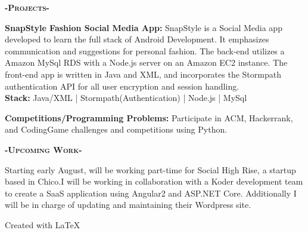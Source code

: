 \documentclass[12pt]{article}
\begin{document}
\begin{center}
\textbf{\textsc{-Projects-}}\\
\end{center}
\begin{footnotesize}

\flushleft
\color{Cerulean}\textbf{SnapStyle Fashion Social Media App:} 
\color{Black}SnapStyle is a Social Media app developed to learn the full stack of Android Development. It emphasizes communication and suggestions for personal fashion. The back-end utilizes a \color{TealBlue}Amazon MySql RDS \color{Black}with a \color{TealBlue}Node.js \color{Black} server on an \color{TealBlue}Amazon EC2 \color{Black}instance. The front-end app is written in \color{TealBlue}Java and XML, \color{Black} and incorporates the \color{TealBlue}Stormpath \color{Black}authentication API for all user encryption and session handling.\\
\smallskip
\setlength\parindent{24pt}\textbf{Stack:} \color{TealBlue} Java/XML | Stormpath(Authentication) | Node.js | MySql
\bigskip

\setlength\parindent{0pt}
\color{Cerulean}\textbf{Competitions/Programming Problems:}
\color{Black}Participate in ACM, Hackerrank, and CodingGame challenges and competitions using \color{TealBlue}Python.\color{Black}

\smallskip
\begin{center}
\textbf{\textsc{-Upcoming Work-}}\\
\end{center}

\color{black}Starting early August, will be working part-time for Social High Rise, a startup based in Chico.I will be working in collaboration with a \color{TealBlue}Koder \color{black} development team to create a SaaS application using \color{TealBlue}Angular2 \color{black}and \color{TealBlue}ASP.NET Core\color{black}. Additionally I will be in charge of updating and maintaining their \color{TealBlue}Wordpress \color{black} site.

\end{footnotesize}

\center
Created with \LaTeX
\end{document}
